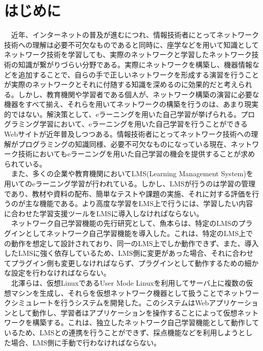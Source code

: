 \section{はじめに}
\label{tag:first}
　近年、インターネットの普及が進むにつれ、情報技術者にとってネットワーク技術への理解は必要不可欠なものであると同時に、座学などを用いて知識としてネットワーク技術を学習しても、実際のネットワークと学習したネットワーク技術の知識が繋がりづらい分野である。実際にネットワークを構築し、機器情報などを追加することで、自らの手で正しいネットワークを形成する演習を行うことが実際のネットワークとそれに付随する知識を深めるのに効果的だと考えられる。しかし、教育機関や学習者である個人が、ネットワーク構築の演習に必要な機器をすべて揃え、それらを用いてネットワークの構築を行うのは、あまり現実的ではない。解決策として、eラーニングを用いた自己学習が挙げられる。プログラミング学習において、eラーニングを用いた自己学習を行うことができるWebサイトが近年普及しつつある。情報技術者にとってネットワーク技術への理解がプログラミングの知識同様、必要不可欠なものになっている現在、ネットワーク技術においてもeラーニングを用いた自己学習の機会を提供することが求められている。\\
　また、多くの企業や教育機関においてLMS(Learning Management System)を用いてのeラーニング学習が行われている。しかし、LMSが行うのは学習の管理であり、教材や資料の配布、簡単なテストや課題の実施、それに対する評価を行うのが主な機能である。より高度な学習をLMS上で行うには、学習したい内容に合わせた学習支援ツールをLMSに導入しなければならない。\\
　ネットワーク自己学習機能の先行研究として、魚本ら\cite{sendai}は、特定のLMSのプラグインとしてネットワーク自己学習機能を導入した。これは、特定のLMS上での動作を想定して設計されており、同一のLMS上でしか動作できず、また、導入したLMSに強く依存しているため、LMS側に変更があった場合、それに合わせてプラグイン側も変更しなければならず、プラグインとして動作するための細かな設定を行わなければならない。\\
　北澤ら\cite{kitazawa}は、仮想LinuxであるUser Mode Linuxを利用してサーバ上に複数の仮想マシンを生成し、それらを仮想ネットワーク機器として扱うことでネットワークシミュレートを行うシステムを開発した。このシステムはWebアプリケーションとして動作し、学習者はアプリケーションを操作することによって仮想ネットワークを構築する。これは、独立したネットワーク自己学習機能として動作しているため、LMSとの連携を行うことができず、採点機能などを利用しようとした場合、LMS側に手動で行わなければならない。\\

